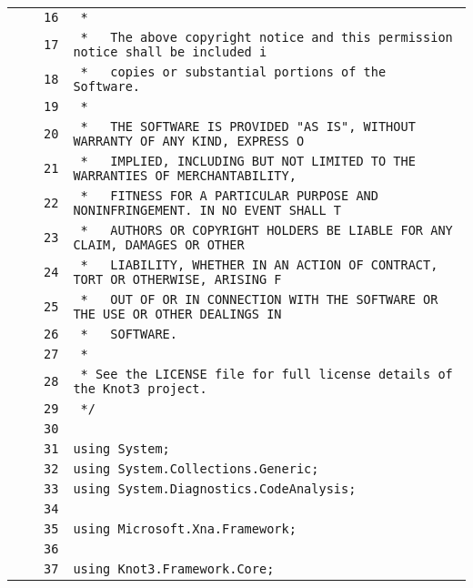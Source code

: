 \documentclass[a4paper,10pt]{article}
\begin{document}
\begin{longtable}[l]{lrrl}
\cellcolor{gray} &  & \verb~16~ & \verb~ *~\\
\cellcolor{gray} &  & \verb~17~ & \verb~ *   The above copyright notice and this permission notice shall be included i~\\
\cellcolor{gray} &  & \verb~18~ & \verb~ *   copies or substantial portions of the Software.~\\
\cellcolor{gray} &  & \verb~19~ & \verb~ *~\\
\cellcolor{gray} &  & \verb~20~ & \verb~ *   THE SOFTWARE IS PROVIDED "AS IS", WITHOUT WARRANTY OF ANY KIND, EXPRESS O~\\
\cellcolor{gray} &  & \verb~21~ & \verb~ *   IMPLIED, INCLUDING BUT NOT LIMITED TO THE WARRANTIES OF MERCHANTABILITY,~\\
\cellcolor{gray} &  & \verb~22~ & \verb~ *   FITNESS FOR A PARTICULAR PURPOSE AND NONINFRINGEMENT. IN NO EVENT SHALL T~\\
\cellcolor{gray} &  & \verb~23~ & \verb~ *   AUTHORS OR COPYRIGHT HOLDERS BE LIABLE FOR ANY CLAIM, DAMAGES OR OTHER~\\
\cellcolor{gray} &  & \verb~24~ & \verb~ *   LIABILITY, WHETHER IN AN ACTION OF CONTRACT, TORT OR OTHERWISE, ARISING F~\\
\cellcolor{gray} &  & \verb~25~ & \verb~ *   OUT OF OR IN CONNECTION WITH THE SOFTWARE OR THE USE OR OTHER DEALINGS IN~\\
\cellcolor{gray} &  & \verb~26~ & \verb~ *   SOFTWARE.~\\
\cellcolor{gray} &  & \verb~27~ & \verb~ *~\\
\cellcolor{gray} &  & \verb~28~ & \verb~ * See the LICENSE file for full license details of the Knot3 project.~\\
\cellcolor{gray} &  & \verb~29~ & \verb~ */~\\
\cellcolor{gray} &  & \verb~30~ & \verb~~\\
\cellcolor{gray} &  & \verb~31~ & \verb~using System;~\\
\cellcolor{gray} &  & \verb~32~ & \verb~using System.Collections.Generic;~\\
\cellcolor{gray} &  & \verb~33~ & \verb~using System.Diagnostics.CodeAnalysis;~\\
\cellcolor{gray} &  & \verb~34~ & \verb~~\\
\cellcolor{gray} &  & \verb~35~ & \verb~using Microsoft.Xna.Framework;~\\
\cellcolor{gray} &  & \verb~36~ & \verb~~\\
\cellcolor{gray} &  & \verb~37~ & \verb~using Knot3.Framework.Core;~\\

\end{longtable}
\end{document}

